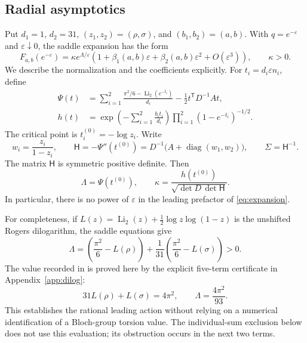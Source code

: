 \documentclass[11pt,reqno]{amsart}
\newcommand{\Li}{\operatorname{Li}}
\newcommand{\diag}{\operatorname{diag}}
\theoremstyle{remark}
\numberwithin{equation}{section}
\begin{document}
\subsection{Radial asymptotics}
Put $d_1=1$, $d_2=31$, $(z_1,z_2)=(\rho,\sigma)$, and
$(b_1,b_2)=(a,b)$. With $q=e^{-\varepsilon}$ and
$\varepsilon\downarrow0$, the saddle expansion has the form
\begin{equation}\label{eq:expansion}
 F_{a,b}(e^{-\varepsilon})
 =\kappa e^{\Lambda/\varepsilon}
 \left(1+\beta_1(a,b)\varepsilon
       +\beta_2(a,b)\varepsilon^2+O(\varepsilon^3)\right),
 \qquad \kappa>0.
\end{equation}
We describe the normalization and the coefficients explicitly.
For $t_i=d_i\varepsilon n_i$, define
\begin{align}
 \Psi(t)&=\sum_{i=1}^2
       \frac{\pi^2/6-\Li_2(e^{-t_i})}{d_i}
       -\frac12t^{\mathsf T}D^{-1}At,\label{eq:phase}\\
 h(t)&=\exp\left(-\sum_{i=1}^2\frac{b_it_i}{d_i}\right)
              \prod_{i=1}^2(1-e^{-t_i})^{-1/2}.\label{eq:amplitude}
\end{align}
The critical point is $t_i^{(0)}=-\log z_i$. Write
\begin{equation}\label{eq:HC}
 w_i=\frac{z_i}{1-z_i},\qquad
 \mathsf H=-\Psi''(t^{(0)})
   =D^{-1}\bigl(A+\diag(w_1,w_2)\bigr),\qquad \Sigma=\mathsf H^{-1}.
\end{equation}
The matrix $\mathsf H$ is symmetric positive definite. Then
\[
 \Lambda=\Psi(t^{(0)}),\qquad
 \kappa=\frac{h(t^{(0)})}{\sqrt{\det D\,\det \mathsf H}}.
\]
In particular, there is no power of $\varepsilon$ in the leading
prefactor of \eqref{eq:expansion}.

For completeness, if
$L(z)=\Li_2(z)+\frac12\log z\log(1-z)$ is the unshifted Rogers
dilogarithm, the saddle equations give
\[
 \Lambda=\left(\frac{\pi^2}{6}-L(\rho)\right)
          +\frac1{31}\left(\frac{\pi^2}{6}-L(\sigma)\right)>0.
\]
The value recorded in \cite[Table~3, row~8]{Brown} is proved here
by the explicit five-term certificate in Appendix~\ref{app:dilog}:
\begin{equation}\label{eq:dilog-value}
 31L(\rho)+L(\sigma)=4\pi^2,\qquad \Lambda=\frac{4\pi^2}{93}.
\end{equation}
This establishes the rational leading action without relying on a
numerical identification of a Bloch-group torsion value. The
individual-sum exclusion below does not use this evaluation; its
obstruction occurs in the next two terms.
\end{document}
